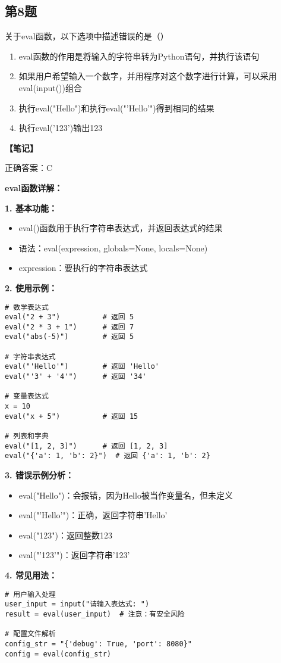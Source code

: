 \subsection{第8题}
关于eval函数，以下选项中描述错误的是（）

\begin{enumerate}[label=\Alph*.]
  \item eval函数的作用是将输入的字符串转为Python语句，并执行该语句
  \item 如果用户希望输入一个数字，并用程序对这个数字进行计算，可以采用eval(input())组合
  \item 执行eval("Hello")和执行eval("'Hello'")得到相同的结果
  \item 执行eval('123')输出123
\end{enumerate}

\begin{mdframed}[linewidth=1pt, linecolor=black]

  \textbf{\color{red}【笔记】}

  正确答案：C

  \textbf{eval函数详解：}

  \textbf{1. 基本功能：}
  \begin{itemize}
    \item eval()函数用于执行字符串表达式，并返回表达式的结果
    \item 语法：eval(expression, globals=None, locals=None)
    \item expression：要执行的字符串表达式
  \end{itemize}

  \textbf{2. 使用示例：}
    \begin{lstlisting}
# 数学表达式
eval("2 + 3")          # 返回 5
eval("2 * 3 + 1")      # 返回 7
eval("abs(-5)")        # 返回 5

# 字符串表达式
eval("'Hello'")        # 返回 'Hello'
eval("'3' + '4'")      # 返回 '34'

# 变量表达式
x = 10
eval("x + 5")          # 返回 15

# 列表和字典
eval("[1, 2, 3]")      # 返回 [1, 2, 3]
eval("{'a': 1, 'b': 2}")  # 返回 {'a': 1, 'b': 2}
    \end{lstlisting}

  \textbf{3. 错误示例分析：}
  \begin{itemize}
    \item eval("Hello")：会报错，因为Hello被当作变量名，但未定义
    \item eval("'Hello'")：正确，返回字符串'Hello'
    \item eval("123")：返回整数123
    \item eval("'123'")：返回字符串'123'
  \end{itemize}

  \textbf{4. 常见用法：}
    \begin{lstlisting}
# 用户输入处理
user_input = input("请输入表达式: ")
result = eval(user_input)  # 注意：有安全风险

# 配置文件解析
config_str = "{'debug': True, 'port': 8080}"
config = eval(config_str)
    \end{lstlisting}
\end{mdframed}

